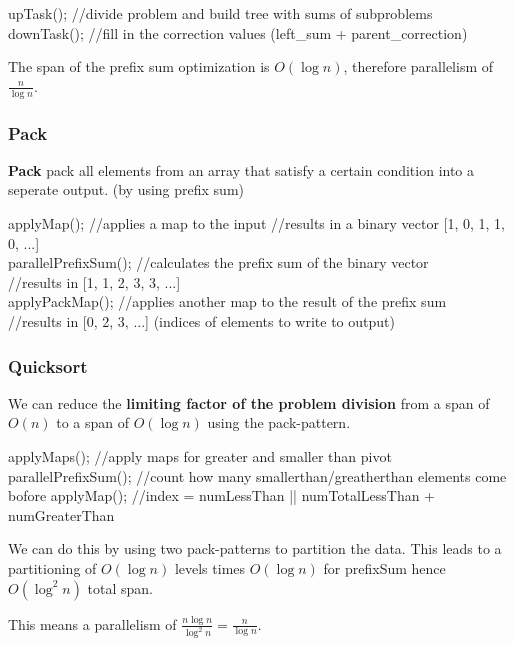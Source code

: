 \begin{algorithm}
upTask(); //divide problem and build tree with sums of subproblems
downTask(); //fill in the correction values (left_sum + parent_correction)
\end{algorithm}

\begin{theorem}
The span of the prefix sum optimization is $O(\log n)$, therefore parallelism of $\frac{n}{\log n}$.
\end{theorem}

\subsubsection{Pack}

\textbf{Pack} pack all elements from an array that satisfy a certain condition into a seperate output. (by using prefix sum)

\begin{algorithm}
applyMap(); //applies a map to the input
//results in a binary vector [1, 0, 1, 1, 0, ...]\\
parallelPrefixSum(); //calculates the prefix sum of the binary vector\\
//results in [1, 1, 2, 3, 3, ...]\\
applyPackMap(); //applies another map to the result of the prefix sum\\
//results in [0, 2, 3, ...] (indices of elements to write to output)
\end{algorithm}

\subsubsection{Quicksort}

We can reduce the \textbf{limiting factor of the problem division} from a span of $O(n)$ to a span of $O(\log n)$
using the pack-pattern.

\begin{algorithm}
applyMaps(); //apply maps for greater and smaller than pivot
parallelPrefixSum(); //count how many smallerthan/greatherthan elements come bofore
applyMap(); //index = numLessThan || numTotalLessThan + numGreaterThan
\end{algorithm}

We can do this by using two pack-patterns to partition the data. This leads to a partitioning of $O(\log n)$
levels times $O(\log n)$ for prefixSum hence $O(\log^2 n)$ total span. 

This means a parallelism of $\frac{n\log n}{\log^2 n} = \frac{n}{\log n}$.

        